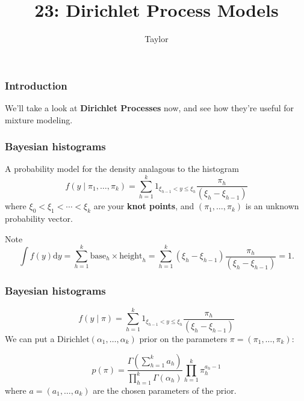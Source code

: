 \documentclass{beamer}
\title["23"]{23: Dirichlet Process Models}
\author{Taylor}
\institute[UVA] 
{
University of Virginia \\
\medskip
\textit{} 
}
\date{}
\begin{document}

\begin{frame}
\titlepage 
\end{frame}

\begin{frame}
\frametitle{Introduction}

We'll take a look at {\bf Dirichlet Processes} now, and see how they're useful for mixture modeling.

\end{frame}
\begin{frame}
\frametitle{Bayesian histograms}

A probability model for the density analagous to the histogram 
$$
f(y \mid \pi_1, \ldots, \pi_k) = \sum_{h=1}^k 1_{\xi_{h-1} < y \le \xi_{h} } \frac{\pi_h}{(\xi_{h} - \xi_{h-1})}
$$
where $\xi_0 < \xi_1 < \cdots < \xi_k$ are your {\bf knot points}, and $(\pi_1, \ldots, \pi_k)$ is an unknown probability vector. 
\newline
\pause

Note
$$
\int f(y) \text{d}y = \sum_{h=1}^k \text{base}_h \times \text{height}_h = \sum_{h=1}^k (\xi_{h} - \xi_{h-1})\frac{\pi_h}{(\xi_{h} - \xi_{h-1})} = 1.
$$

\end{frame}


\begin{frame}
\frametitle{Bayesian histograms}

$$
f(y \mid \pi) = \sum_{h=1}^k 1_{\xi_{h-1} < y \le \xi_{h} } \frac{\pi_h}{(\xi_{h} - \xi_{h-1})}
$$
We can put a $\text{Dirichlet}(\alpha_1, \ldots, \alpha_k)$ prior on the parameters $\pi = (\pi_1, \ldots, \pi_k)$:

$$
p(\pi ) = \frac{\Gamma\left( \sum_{h=1}^k a_h \right) }{\prod_{h=1}^k \Gamma(\alpha_h) } \prod_{h=1}^k \pi_h^{a_h-1}
$$
where $a = (a_1, \ldots, a_k)$ are the chosen parameters of the prior.

\end{frame}
\end{document}
